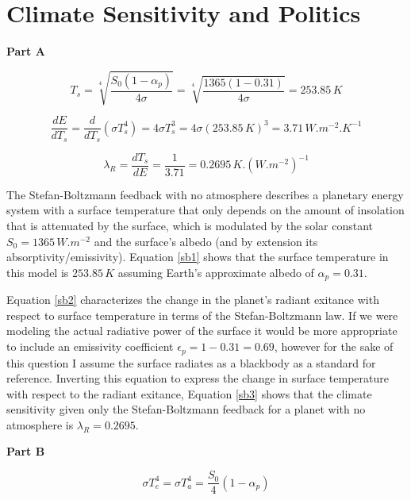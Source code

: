 \documentclass[12pt]{article}
\begin{document}
\section{Climate Sensitivity and Politics}

\noindent\textbf{Part A}

\begin{equation}\label{sb1}
    T_s = \sqrt[4]{\frac{S_0 (1-\alpha_p)}{4 \sigma}} = \sqrt[4]{\frac{1365 (1-0.31)}{4 \sigma}} = 253.85\,\si{K}
\end{equation}

\begin{equation}\label{sb2}
    \frac{d E}{d T_s} =  \frac{d}{dT_s}(\sigma T_s^4) = 4\sigma T_s^3 = 4 \sigma (253.85\,\si{K})^3 = 3.71\,\si{W.m^{-2}.K^{-1}}
\end{equation}

\begin{equation}\label{sb3}
    \lambda_R = \frac{d T_s}{d E} = \frac{1}{3.71} = 0.2695\,\si{K.(W.m^{-2})^{-1}}
\end{equation}

The Stefan-Boltzmann feedback with no atmosphere describes a planetary energy system with a surface temperature that only depends on the amount of insolation that is attenuated by the surface, which is modulated by the solar constant $S_0 = 1365\,\si{W.m^{-2}}$ and the surface's albedo (and by extension its absorptivity/emissivity). Equation \ref{sb1} shows that the surface temperature in this model is $253.85\,\si{K}$ assuming Earth's approximate albedo of $\alpha_p = 0.31$.

Equation \ref{sb2} characterizes the change in the planet's radiant exitance with respect to surface temperature in terms of the Stefan-Boltzmann law. If we were modeling the actual radiative power of the surface it would be more appropriate to include an emissivity coefficient $\epsilon_p = 1-0.31 = 0.69$, however for the sake of this question I assume the surface radiates as a blackbody as a standard for reference. Inverting this equation to express the change in surface temperature with respect to the radiant exitance, Equation \ref{sb3} shows that the climate sensitivity given only the Stefan-Boltzmann feedback for a planet with no atmosphere is $\lambda_R = 0.2695$.

\vspace{2em}\noindent\textbf{Part B}

\begin{equation}\label{q2b1}
    \sigma T_e^4 = \sigma T_a^4 = \frac{S_0}{4}(1-\alpha_p)
\end{equation}
\end{document}
